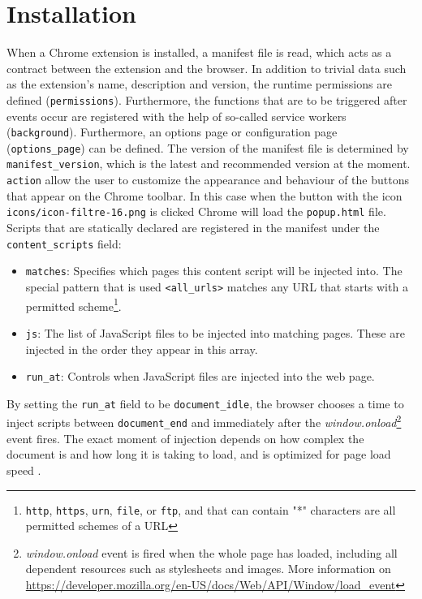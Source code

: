 \section{Installation}
When a Chrome extension is installed, a manifest file is read, which acts as a contract between the extension and the browser. In addition to trivial data such as the extension's name, description and version, the runtime permissions are defined (\texttt{permissions}). Furthermore, the functions that are to be triggered after events occur are registered with the help of so-called service workers (\texttt{background}). Furthermore, an options page or configuration page (\verb;options_page;) can be defined. The version of the manifest file is determined by \verb;manifest_version;, which is the latest and recommended version at the moment. \texttt{action} allow the user to customize the appearance and behaviour of the buttons that appear on the Chrome toolbar. In this case when the button with the icon \texttt{icons/icon-filtre-16.png} is clicked Chrome will load the \texttt{popup.html} file. Scripts that are statically declared are registered in the manifest under the \verb;content_scripts; field:
\begin{itemize}
  \item \texttt{matches}: Specifies which pages this content script will be injected into. The special pattern that is used \verb;<all_urls>; matches any URL that starts with a permitted scheme\footnote{\texttt{http}, \texttt{https}, \texttt{urn}, \texttt{file}, or \texttt{ftp}, and that can contain "*" characters are all permitted schemes of a URL}.
  \item \texttt{js}: The list of JavaScript files to be injected into matching pages. These are injected in the order they appear in this array.
  \item \verb;run_at;: Controls when JavaScript files are injected into the web page.
\end{itemize}

By setting the \verb;run_at; field to be \verb;document_idle;, the browser chooses a time to inject scripts between \verb;document_end; and immediately after the \emph{window.onload}\footnote{\emph{window.onload} event is fired when the whole page has loaded, including all dependent resources such as stylesheets and images. More information on \url{https://developer.mozilla.org/en-US/docs/Web/API/Window/load_event}} event fires. The exact moment of injection depends on how complex the document is and how long it is taking to load, and is optimized for page load speed \autocite{chrome2021runtime}.

